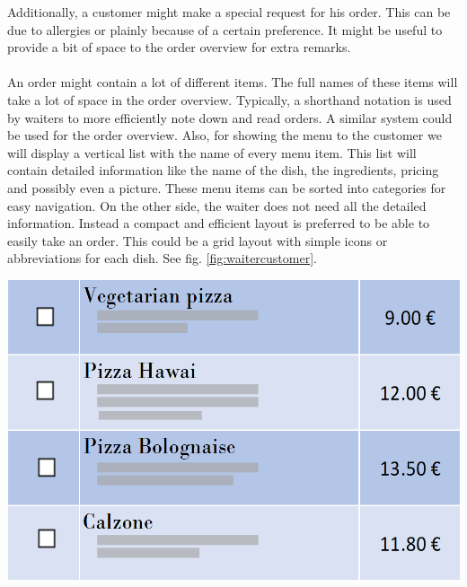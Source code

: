 \documentclass[12pt]{article}
\newenvironment{Figure}
	{\par\medskip\noindent\minipage{\linewidth}}
	{\endminipage\par\medskip}
\begin{document}
\begin{multicols}{2}
Additionally, a customer might make a special request for his order. This can be due to allergies or plainly because of a certain preference. It might be useful to provide a bit of space to the order overview for extra remarks.
\\\\
An order might contain a lot of different items. The full names of these items will take a lot of space in the order overview. Typically, a shorthand notation is used by waiters to more efficiently note down and read orders. A similar system could be used for the order overview.
Also, for showing the menu to the customer we will display a vertical list with the name of every menu item. This list will contain detailed information like the name of the dish, the ingredients, pricing and possibly even a picture. These menu items can be sorted into categories for easy navigation. On the other side, the waiter does not need all the detailed information. Instead a compact and efficient layout is preferred to be able to easily take an order. This could be a grid layout with simple icons or abbreviations for each dish. See fig. \ref{fig:waitercustomer}.
\begin{Figure}
	\includegraphics[width=\linewidth]{illustrations/customermenu.PNG}
	\label{fig:menucustomer}
\end{Figure}
\begin{Figure}

\end{Figure}
\end{multicols}
\end{document}
